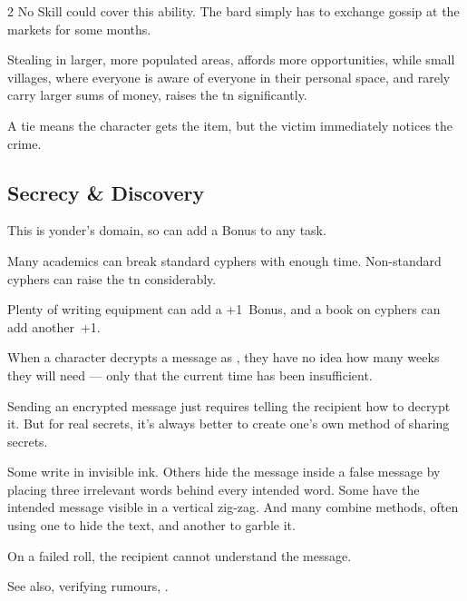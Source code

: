 \begin{multicols}{2}
No Skill could cover this ability.
The bard simply has to exchange gossip at the markets for some months.

Stealing in larger, more populated areas, affords more opportunities, while small \glspl{village}, where everyone is aware of everyone in their personal space, and rarely carry larger sums of money, raises the \gls{tn} significantly.

A tie means the character gets the item, but the victim immediately notices the crime.

\larcenyChart

\subsection{Secrecy \& Discovery}

This is \gls{yonder}'s domain, so  can add a Bonus to any task.

Many academics can break standard cyphers with enough time.
Non-standard cyphers can raise the \gls{tn} considerably.

Plenty of writing equipment can add a +1~Bonus, and a book on cyphers can add
another~+1.

When a character decrypts a message as , they have no idea
how many weeks they will need --- only that the current time has been
insufficient.

Sending an encrypted message just requires telling the recipient how to decrypt it.
But for real secrets, it's always better to create one's own method of sharing secrets.

Some write in invisible ink.
Others hide the message inside a false message by placing three irrelevant words behind every intended word.
Some have the intended message visible in a vertical zig-zag.
And many combine methods, often using one to hide the text, and another to garble it.

\preto{}

On a failed roll, the recipient cannot understand the message.

See also, verifying rumours, .


\end{multicols}
